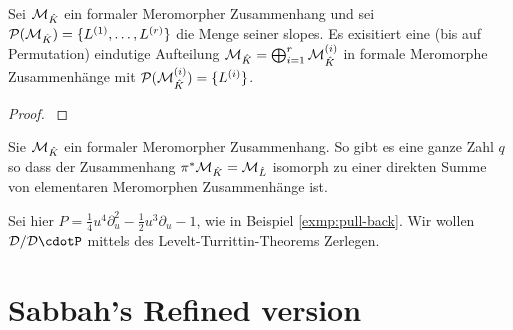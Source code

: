 \begin{thm}
  \cite[Thm 5.3.1]{sabbah_cimpa90}
  Sei $\mathcal{M}_{\hat{K}}$ ein formaler Meromorpher Zusammenhang und sei
  $\mathcal{P}(\mathcal{M}_{\hat K})=\{L^{(1)},\dots,L^{(r)}\}$ die Menge seiner slopes. Es
  exisitiert eine (bis auf Permutation) eindutige Aufteilung $\mathcal{M}_{\hat
  K}=\bigoplus_{i=1}^r\mathcal{M}_{\hat K}^{(i)}$ in formale Meromorphe Zusammenhänge
  mit $\mathcal{P}(\mathcal{M}_{\hat K}^{(i)})=\{L^{(i)}\}$.
\end{thm}
\begin{proof}
  \cite[Thm 5.3.1]{sabbah_cimpa90}
\end{proof}
\begin{comment}
  Aussagen, die aus dem Beweis entstehen:\\
  Wir erhalten die Exacte Sequenz
  \[
    0 \rightarrow \cD_{\hat K}/\cD_{\hat K} \cdot P_1
    \rightarrow \cD_{\hat K}/\cD_{\hat K} \cdot P
    \rightarrow \cD_{\hat K}/\cD_{\hat K} \cdot P_2
    \rightarrow 0
  \]
  \begin{cor}
    \cite[Thm 5.3.4]{sabbah_cimpa90}
    $\cP(P)=\cP(P_1)\cup\cP(P_2)$ und $\cP(P_1)\cap\cP(P_2)=\emptyset$
  \end{cor}
\end{comment}
\begin{comment}
  \cite[Page 34]{sabbah_cimpa90}
  Sei $\cM_{\hat K}$ ein formaler Meromorpher Zusammenhang. Man definiert
  $\pi^*\cM_{\hat K}$ als den Vektor Raum über $\hat L:\pi^*\cM_{\hat K}=\hat
  L\otimes_{\hat K}\cM_{\hat K}$. Dann definiert man die Wirkung von
  $\partial_t$ durch: $t\partial_t\cdot(1\otimes
  m)=q(1\otimes(x\partial_x\otimes m))$ und damit
  \[
    t\partial_t\cdot(\phi\otimes m)=q(\phi\otimes(x\partial_x\cdot
    m))+((t\frac{\partial\phi}{\partial t})\otimes m) \,.
  \]
\end{comment}
\begin{thm}
  \cite[Thm 5.4.7]{sabbah_cimpa90}
  Sie $\mathcal{M}_{\hat K}$ ein formaler Meromorpher Zusammenhang. So gibt es eine
  ganze Zahl $q$ so dass der Zusammenhang $\pi^*\mathcal{M}_{\hat K}=\mathcal{M}_{\hat L}$
  isomorph zu einer direkten Summe von elementaren Meromorphen Zusammenhänge
  ist.
\end{thm}

\begin{exmp}
  Sei hier $P=\frac{1}{4}u^4\partial_u^2-\frac{1}{2}u^3\partial_u-1$, wie in
  Beispiel \ref{exmp:pull-back}.
  Wir wollen $\cD/\cD\cdotP$ mittels des Levelt-Turrittin-Theorems Zerlegen.
\end{exmp}

\section{Sabbah's Refined version}

